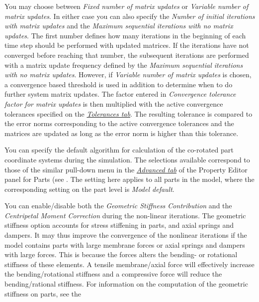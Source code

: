 {\begin{bulletlist}
  You may choose between {\sl Fixed number of matrix updates} or
  {\sl Variable number of matrix updates}. In either case you can also specify
  the {\sl Number of initial iterations with matrix updates} and
  the {\sl Maximum sequential iterations with no matrix updates}.
  The first number defines how many iterations in the beginning of each time
  step should be performed with updated matrices. If the iterations have not
  converged before reaching that number, the subsequent iterations are performed
  with a matrix update frequency defined by the
  {\sl Maximum sequential iterations with no matrix updates}.
  However, if {\sl Variable number of matrix updates} is chosen,
  a convergence based threshold is used in addition to determine when to
  do further system matrix updates.
  The factor entered in {\sl Convergence tolerance factor for matrix updates}
  is then multiplied with the active convergence tolerances specified on the
  \protect\hyperlink{tolerances-tab}{\sl Tolerances tab}.
  The resulting tolerance is compared to the error norms corresponding to the
  active convergence tolerances and the matrices are updated
  as long as the error norm is higher than this tolerance.

\item You can specify the default algorithm for
  calculation of the co-rotated part coordinate systems during the simulation.
  The selections available correspond to those of the similar pull-down menu in
  the \protect\hyperlink{advanced-tab}{\sl Advanced tab} of the Property Editor
  panel for Parts (see .
  The setting here applies to all parts in the model, where the corresponding
  setting on the part level is {\sl Model default}.

\item You can enable/disable both the
  {\sl Geometric Stiffness Contribution} and the
  {\sl Centripetal Moment Correction} during the non-linear iterations.
  The geometric stiffness option accounts for stress stiffening in parts,
  and axial springs and dampers. It may thus improve the convergence of
  the nonlinear iterations if the model contains parts with large membrane
  forces or axial springs and dampers with large forces. This is because
  the forces alters the bending- or rotational stiffness of these elements.
  A tensile membrane/axial force will effectively increase the
  bending/rotational stiffness and a compressive force will reduce the
  bending/rational stiffness. For information on the computation of the
  geometric stiffness on parts, see the


\end{bulletlist}}
